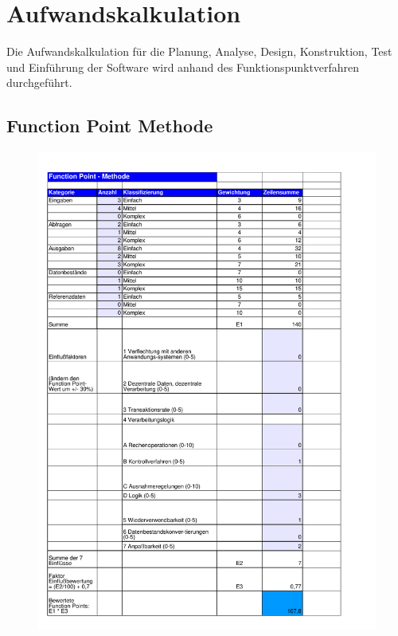 \clearpage
\chapter{Aufwandskalkulation}
Die Aufwandskalkulation für die Planung, Analyse, Design, Konstruktion, Test und Einführung der Software wird anhand des Funktionspunktverfahren durchgeführt.

\clearpage
\section{Function Point Methode}
\begin{figure}[!h]
	\centering
    \includegraphics[width=15cm]{./FunctionPoint_filled.pdf}
	\label{layout_gesamt}
\end{figure}

